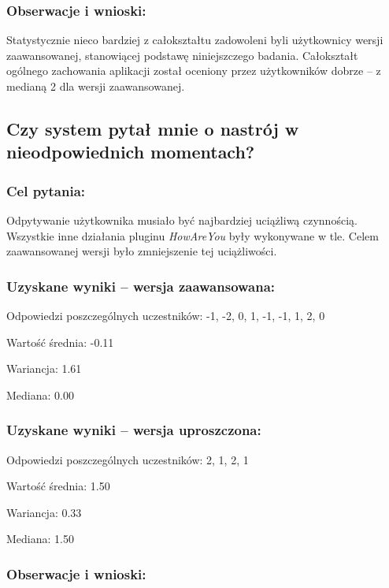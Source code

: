 	\subsubsection{Obserwacje i wnioski:}
	
	Statystycznie nieco bardziej z całokształtu zadowoleni byli użytkownicy wersji zaawansowanej, stanowiącej podstawę niniejszczego badania. Całokształt ogólnego zachowania aplikacji został oceniony przez użytkowników dobrze -- z medianą 2 dla wersji zaawansowanej.


\subsection{Czy system pytał mnie o nastrój w nieodpowiednich momentach?}

	\subsubsection{Cel pytania:}
	
	Odpytywanie użytkownika musiało być najbardziej uciążliwą czynnością. Wszystkie inne działania pluginu \textit{HowAreYou} były wykonywane w tle. Celem zaawansowanej wersji było zmniejszenie tej uciążliwości.
	
	\subsubsection{Uzyskane wyniki -- wersja zaawansowana:}
	
	Odpowiedzi poszczególnych uczestników: -1, -2, 0, 1, -1, -1, 1, 2, 0
	
	Wartość średnia: -0.11
	
	Wariancja: 1.61
	
	Mediana: 0.00
	
	\subsubsection{Uzyskane wyniki -- wersja uproszczona:}
	
	Odpowiedzi poszczególnych uczestników: 2, 1, 2, 1
	
	Wartość średnia: 1.50
	
	Wariancja: 0.33
	
	Mediana: 1.50
	
	\subsubsection{Obserwacje i wnioski:}
	
